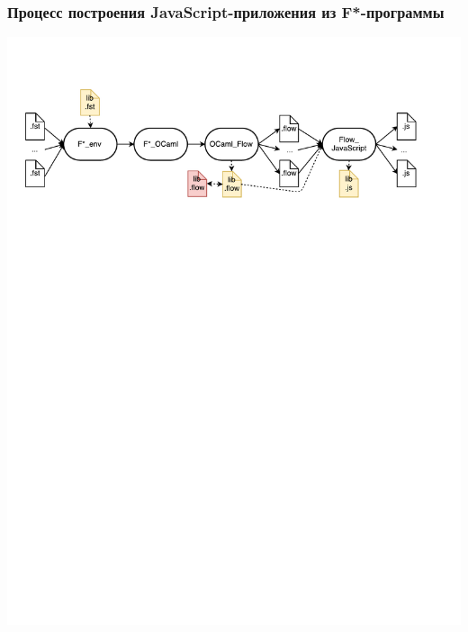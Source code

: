\documentclass{beamer}
\begin{document}
\begin{frame}
\transwipe[direction=90]
\frametitle{Процесс построения JavaScript-приложения из F*-программы}

\begin{center}
   {\includegraphics[width=1.0\linewidth]{Workflow}}
\end{center}

\end{frame}
\end{document}
